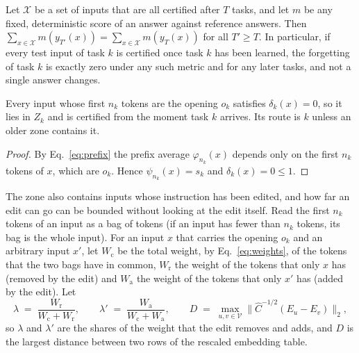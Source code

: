 \begin{corollary}
\label{cor:zero}
Let $\mathcal{X}$ be a set of inputs that are all certified after $T$ tasks, and let $m$ be any fixed, deterministic score of an
answer against reference answers. Then $\sum_{x \in \mathcal{X}} m(y_{T'}(x)) = \sum_{x \in \mathcal{X}} m(y_T(x))$ for all
$T' \ge T$. In particular, if every test input of task $k$ is certified once task $k$ has been
learned, the forgetting of task $k$ is exactly zero under any such metric and for any later tasks, and
not a single answer changes.
\end{corollary}

\begin{proposition}
\label{prop:own}
Every input whose first $n_k$ tokens are the opening $o_k$ satisfies $\delta_k(x) = 0$, so it lies in
$Z_k$ and is certified from the moment task $k$ arrives. Its route is $k$ unless an older
zone contains it.
\end{proposition}

\begin{proof}
By Eq.~\eqref{eq:prefix} the prefix average $\varphi_{n_k}(x)$ depends only on the first $n_k$ tokens
of $x$, which are $o_k$. Hence $\psi_{n_k}(x) = s_k$ and $\delta_k(x) = 0 \le 1$.
\end{proof}

The zone also contains inputs whose instruction has been edited, and how far an edit can go
can be bounded without looking at the edit itself. Read the first $n_k$ tokens of an input as a bag
of tokens (if an input has fewer than $n_k$ tokens, its bag is the whole input). For an input $x$ that carries the opening $o_k$ and an arbitrary input $x'$, let $W_{\mathrm{c}}$ be
the total weight, by Eq.~\eqref{eq:weights}, of the tokens that the two bags have in common, $W_{\mathrm{r}}$
the weight of the tokens that only $x$ has (removed by the edit) and $W_{\mathrm{a}}$ the weight of the tokens
that only $x'$ has (added by the edit). Let
\begin{equation}
  \lambda \;=\; \frac{W_{\mathrm{r}}}{W_{\mathrm{c}} + W_{\mathrm{r}}}, \qquad \lambda' \;=\; \frac{W_{\mathrm{a}}}{W_{\mathrm{c}} + W_{\mathrm{a}}}, \qquad
  D \;=\; \max_{u, v \in \mathcal{V}} \bigl\lVert \hat{C}^{-1/2} (E_u - E_v) \bigr\rVert_2 ,
  \label{eq:shares}
\end{equation}
so $\lambda$ and $\lambda'$ are the shares of the weight that the edit removes and adds, and $D$ is
the largest distance between two rows of the rescaled embedding table.

